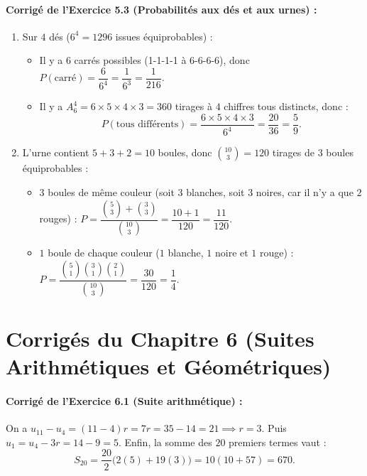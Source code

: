 \paragraph{Corrigé de l'Exercice 5.3 (Probabilités aux dés et aux urnes) :}
\begin{enumerate}[label=(\alph*)]
    \item Sur $4$ dés ($6^4 = 1296$ issues équiprobables) :
    \begin{itemize}
        \item Il y a $6$ carrés possibles (1-1-1-1 à 6-6-6-6), donc $P(\text{carré}) = \dfrac{6}{6^4} = \dfrac{1}{6^3} = \boxed{\dfrac{1}{216}}$.
        \item Il y a $A_6^4 = 6 \times 5 \times 4 \times 3 = 360$ tirages à $4$ chiffres tous distincts, donc :
        \[
            P(\text{tous différents}) = \frac{6 \times 5 \times 4 \times 3}{6^4} = \frac{20}{36} = \boxed{\frac{5}{9}}.
        \]
    \end{itemize}
    \item L'urne contient $5 + 3 + 2 = 10$ boules, donc $\binom{10}{3} = 120$ tirages de $3$ boules équiprobables :
    \begin{itemize}
        \item $3$ boules de même couleur (soit $3$ blanches, soit $3$ noires, car il n'y a que $2$ rouges) : $P = \dfrac{\binom{5}{3} + \binom{3}{3}}{\binom{10}{3}} = \dfrac{10 + 1}{120} = \boxed{\dfrac{11}{120}}$.
        \item $1$ boule de chaque couleur ($1$ blanche, $1$ noire et $1$ rouge) : $P = \dfrac{\binom{5}{1}\binom{3}{1}\binom{2}{1}}{\binom{10}{3}} = \dfrac{30}{120} = \boxed{\dfrac{1}{4}}$.
    \end{itemize}
\end{enumerate}

\section{Corrigés du Chapitre 6 (Suites Arithmétiques et Géométriques)}

\paragraph{Corrigé de l'Exercice 6.1 (Suite arithmétique) :}
On a $u_{11} - u_4 = (11 - 4)r = 7r = 35 - 14 = 21 \implies \boxed{r = 3}$.
Puis $u_1 = u_4 - 3r = 14 - 9 = \boxed{5}$. Enfin, la somme des $20$ premiers termes vaut :
\[
    S_{20} = \frac{20}{2}\bigl(2(5) + 19(3)\bigr) = 10(10 + 57) = \boxed{670}.
\]


